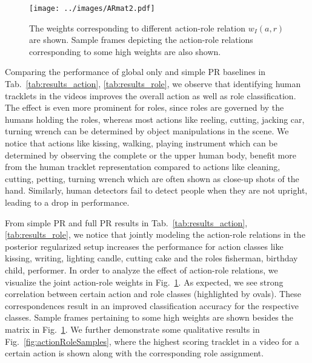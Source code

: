 \documentclass[10pt,twocolumn,letterpaper]{article}
\begin{document}
\vspace*{-3pt}

\begin{figure}[ht!]
\centering
   \texttt{[image: ../images/ARmat2.pdf]}
      \caption{The weights corresponding to different action-role relation $w_I(a,r)$ are shown. Sample frames depicting the action-role relations corresponding to some high weights are also shown.}
\label{fig:action_role_matrix}
\end{figure}
\vspace*{-5pt}

Comparing the performance of global only and simple PR baselines in Tab.~\ref{tab:results_action}, \ref{tab:results_role}, we observe that identifying human tracklets in the videos improves the overall action as well as role classification. The effect is even more prominent for roles, since roles are governed by the humans holding the roles, whereas most actions like reeling, cutting, jacking car, turning wrench can be determined by object manipulations in the scene. We notice that actions like kissing, walking, playing instrument which can be determined by observing the complete or the upper human body, benefit more from the human tracklet representation compared to actions like cleaning, cutting, petting, turning wrench which are often shown as close-up shots of the hand. Similarly, human detectors fail to detect people when they are not upright, leading to a drop in performance.

From simple PR and full PR results in Tab.~\ref{tab:results_action},
\ref{tab:results_role}, we notice that jointly modeling the action-role
relations in the posterior regularized setup increases the performance for
action classes like kissing, writing, lighting candle, cutting cake and the
roles fisherman, birthday child, performer. In order to analyze the effect of
action-role relations, we visualize the joint action-role weights in
Fig.~\ref{fig:action_role_matrix}. As expected, we see strong correlation
between certain action and role classes (highlighted by ovals). These
correspondences result in an improved classification accuracy for the
respective classes. Sample frames pertaining to some high weights are shown
besides the matrix in Fig.~\ref{fig:action_role_matrix}. We further demonstrate
some qualitative results in Fig.~\ref{fig:actionRoleSamples}, where the highest
scoring tracklet in a video for a certain action is shown along with the
corresponding role assignment.
\end{document}
